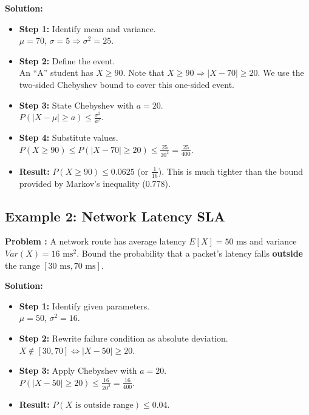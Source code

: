 \documentclass[11pt]{article}
\begin{document}
\vspace{0.2cm}
\noindent \textbf{Solution:} 
\begin{itemize}
    \item \textbf{Step 1:} Identify mean and variance. \\ $\mu = 70$, $\sigma = 5 \Rightarrow \sigma^2 = 25$.
    \item \textbf{Step 2:} Define the event. \\ An ``A'' student has $X \ge 90$. Note that $X \ge 90 \Rightarrow |X - 70| \ge 20$. We use the two-sided Chebyshev bound to cover this one-sided event.
    \item \textbf{Step 3:} State Chebyshev with $a = 20$. \\ $P(|X - \mu| \ge a) \le \frac{\sigma^2}{a^2}$.
    \item \textbf{Step 4:} Substitute values. \\ $P(X \ge 90) \le P(|X - 70| \ge 20) \le \frac{25}{20^2} = \frac{25}{400}$.
    \item \textbf{Result:} $P(X \ge 90) \le 0.0625$ (or $\frac{1}{16}$). This is much tighter than the bound provided by Markov’s inequality (0.778).
\end{itemize}

\vspace{0.4cm}

\subsection*{Example 2: Network Latency SLA} 

\textbf{Problem :} A network route has average latency $E[X] = 50\text{ ms}$ and variance $Var(X) = 16\text{ ms}^2$. Bound the probability that a packet's latency falls \textbf{outside} the range $[30\text{ ms}, 70\text{ ms}]$.

\vspace{0.2cm}
\noindent \textbf{Solution:} 
\begin{itemize}
    \item \textbf{Step 1:} Identify given parameters. \\ $\mu = 50$, $\sigma^2 = 16$.
    \item \textbf{Step 2:} Rewrite failure condition as absolute deviation. \\ $X \notin [30, 70] \iff |X - 50| \ge 20$.
    \item \textbf{Step 3:} Apply Chebyshev with $a = 20$. \\ $P(|X - 50| \ge 20) \le \frac{16}{20^2} = \frac{16}{400}$.
    \item \textbf{Result:} $P(X \text{ is outside range}) \le 0.04$.
\end{itemize}
\end{document}
